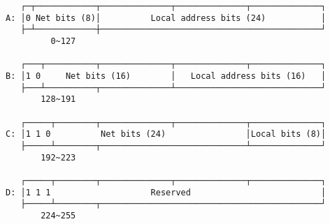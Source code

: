 \documentclass[varwidth=30cm,crop]{standalone}
\begin{document}
\begin{verbatim}
   ┌─┬────────────┬──────────────┬──────────────┬──────────────┐
A: │0 Net bits (8)│          Local address bits (24)           │
   ├─┴────────────┼────────────────────────────────────────────┘
         0~127

   ┌───┬──────────┬──────────────┬──────────────┬──────────────┐
B: │1 0     Net bits (16)        │   Local address bits (16)   │
   ├───┴──────────┬──────────────┴─────────────────────────────┘
       128~191

   ┌─────┬────────┬──────────────┬──────────────┬──────────────┐
C: │1 1 0          Net bits (24)                │Local bits (8)│
   ├─────┴────────┬─────────────────────────────┴──────────────┘
       192~223

   ┌─────┬────────┬──────────────┬──────────────┬──────────────┐
D: │1 1 1                    Reserved                          │
   ├─────┴────────┬────────────────────────────────────────────┘
       224~255
\end{verbatim}
\end{document}
